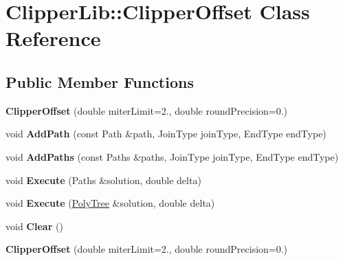\hypertarget{classClipperLib_1_1ClipperOffset}{}\section{Clipper\+Lib\+:\+:Clipper\+Offset Class Reference}
\label{classClipperLib_1_1ClipperOffset}
\subsection*{Public Member Functions}
\begin{DoxyCompactItemize}
\item 
\mbox{\label{classClipperLib_1_1ClipperOffset_a45b4750989901db0c3865c374abdfcdc}} 
{\bfseries Clipper\+Offset} (double miter\+Limit=2., double round\+Precision=0.)
\item 
\mbox{\label{classClipperLib_1_1ClipperOffset_a0cd68e3690072f510924a5b25291043b}} 
void {\bfseries Add\+Path} (const Path \&path, Join\+Type join\+Type, End\+Type end\+Type)
\item 
\mbox{\label{classClipperLib_1_1ClipperOffset_a18b35198f6370d76885af995ee2f16cb}} 
void {\bfseries Add\+Paths} (const Paths \&paths, Join\+Type join\+Type, End\+Type end\+Type)
\item 
\mbox{\label{classClipperLib_1_1ClipperOffset_ac591b25e483a52c99c3190a256ad4589}} 
void {\bfseries Execute} (Paths \&solution, double delta)
\item 
\mbox{\label{classClipperLib_1_1ClipperOffset_a3aaa9fcc20e503c967a23f1793536118}} 
void {\bfseries Execute} (\hyperlink{classClipperLib_1_1PolyTree}{Poly\+Tree} \&solution, double delta)
\item 
\mbox{\label{classClipperLib_1_1ClipperOffset_ab444433587b6a3f6c89655938d889c7d}} 
void {\bfseries Clear} ()
\item 
\mbox{\label{classClipperLib_1_1ClipperOffset_a45b4750989901db0c3865c374abdfcdc}} 
{\bfseries Clipper\+Offset} (double miter\+Limit=2., double round\+Precision=0.)

\end{DoxyCompactItemize}
